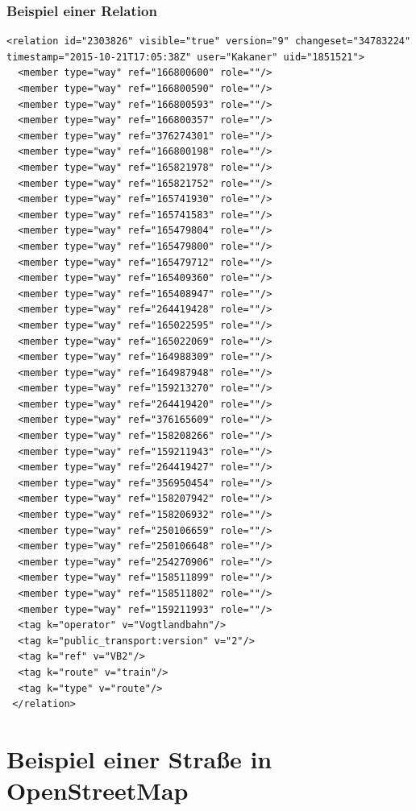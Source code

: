 \subsubsection{Beispiel einer Relation}
\begin{lstlisting}
<relation id="2303826" visible="true" version="9" changeset="34783224" timestamp="2015-10-21T17:05:38Z" user="Kakaner" uid="1851521">
  <member type="way" ref="166800600" role=""/>
  <member type="way" ref="166800590" role=""/>
  <member type="way" ref="166800593" role=""/>
  <member type="way" ref="166800357" role=""/>
  <member type="way" ref="376274301" role=""/>
  <member type="way" ref="166800198" role=""/>
  <member type="way" ref="165821978" role=""/>
  <member type="way" ref="165821752" role=""/>
  <member type="way" ref="165741930" role=""/>
  <member type="way" ref="165741583" role=""/>
  <member type="way" ref="165479804" role=""/>
  <member type="way" ref="165479800" role=""/>
  <member type="way" ref="165479712" role=""/>
  <member type="way" ref="165409360" role=""/>
  <member type="way" ref="165408947" role=""/>
  <member type="way" ref="264419428" role=""/>
  <member type="way" ref="165022595" role=""/>
  <member type="way" ref="165022069" role=""/>
  <member type="way" ref="164988309" role=""/>
  <member type="way" ref="164987948" role=""/>
  <member type="way" ref="159213270" role=""/>
  <member type="way" ref="264419420" role=""/>
  <member type="way" ref="376165609" role=""/>
  <member type="way" ref="158208266" role=""/>
  <member type="way" ref="159211943" role=""/>
  <member type="way" ref="264419427" role=""/>
  <member type="way" ref="356950454" role=""/>
  <member type="way" ref="158207942" role=""/>
  <member type="way" ref="158206932" role=""/>
  <member type="way" ref="250106659" role=""/>
  <member type="way" ref="250106648" role=""/>
  <member type="way" ref="254270906" role=""/>
  <member type="way" ref="158511899" role=""/>
  <member type="way" ref="158511802" role=""/>
  <member type="way" ref="159211993" role=""/>
  <tag k="operator" v="Vogtlandbahn"/>
  <tag k="public_transport:version" v="2"/>
  <tag k="ref" v="VB2"/>
  <tag k="route" v="train"/>
  <tag k="type" v="route"/>
 </relation>
\end{lstlisting}

\section{Beispiel einer Straße in OpenStreetMap}
\label{sec:appenix:osm:streets}